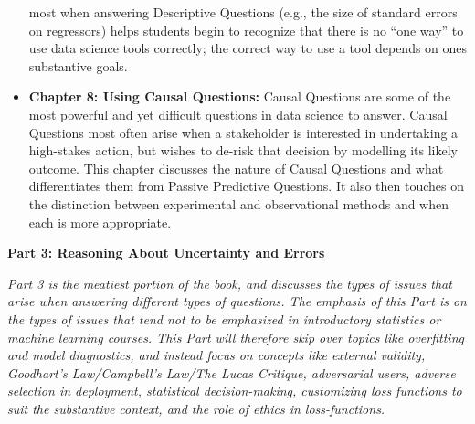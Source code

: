 \documentclass[12pt]{article}
\begin{document}
\begin{itemize}
  most when answering Descriptive Questions (e.g., the size of standard
  errors on regressors) helps students begin to recognize that there is
  no ``one way'' to use data science tools correctly; the correct way to
  use a tool depends on ones substantive goals.
\item
  \textbf{Chapter 8: Using Causal Questions:} Causal Questions are some
  of the most powerful and yet difficult questions in data science to
  answer. Causal Questions most often arise when a stakeholder is
  interested in undertaking a high-stakes action, but wishes to de-risk
  that decision by modelling its likely outcome. This chapter discusses
  the nature of Causal Questions and what differentiates them from
  Passive Predictive Questions. It also then touches on the distinction
  between experimental and observational methods and when each is more
  appropriate.
\end{itemize}

\textbf{Part 3: Reasoning About Uncertainty and Errors}

\emph{Part 3 is the meatiest portion of the book, and discusses the
types of issues that arise when answering different types of questions.
The emphasis of this Part is on the types of issues that tend not to be
emphasized in introductory statistics or machine learning courses. This
Part will therefore skip over topics like overfitting and model
diagnostics, and instead focus on concepts like external validity,
Goodhart's Law/Campbell's Law/The Lucas Critique, adversarial users,
adverse selection in deployment, statistical decision-making,
customizing loss functions to suit the substantive context, and the role
of ethics in loss-functions.}
\end{document}
